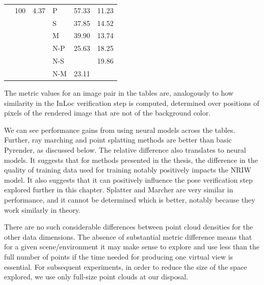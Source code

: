 \begin{table}[h]
\begin{tabular}{l c c l S[table-format=3.2] S[table-format=3.2]}
                 & 100 & 4.37 & P   &    57.33  &    11.23  \\
                 &     &      & S   &    37.85  &    14.52  \\
                 &     &      & M   &    39.90  &    13.74  \\
                 &     &      & N-P &    25.63  &    18.25  \\
                 &     &      & N-S &  &    19.86  \\
                 &     &      & N-M &    23.11  &  \\
    \bottomrule
    \end{tabular}
\label{tab:grand_rendering_metrics}
\end{table}

The metric values for an image pair in the tables are, analogously to
how similarity in the InLoc verification step is computed, determined over
positions of pixels of the rendered image that are not
of the background color.

We can see performance gains from using neural models across the tables.
Further, ray marching and point splatting methods are better than basic
Pyrender, as discussed below. The relative difference also translates to
neural models. It suggests that for methods presented in the thesis, the
difference in the quality of training data used for training notably
positively impacts the NRIW model. It also suggests that it can positively
influence the pose verification step explored further in this chapter.
Splatter and Marcher are very similar in performance, and it cannot be
determined which is better, notably because they work similarly in theory.

There are no such considerable differences between point cloud densities
for the other data dimensions. The absence of substantial metric difference
means that for a given scene/environment it may make sense to explore and use
less than the full number of points if the time needed for producing one virtual
view is essential. For subsequent experiments, in order to reduce the size of
the space explored, we use only full-size point clouds at our disposal.

